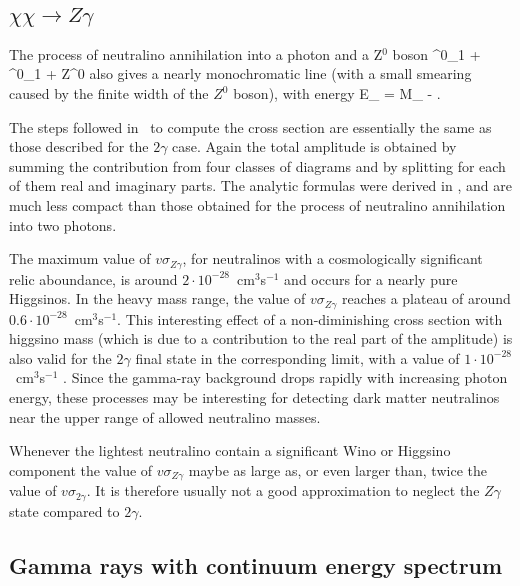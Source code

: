 \subsection{$\chi\chi\to Z\gamma$}

The process of neutralino annihilation into a photon and a Z$^0$ boson
\cite{ub}
\beq
\tilde{\chi}^{0}_{1} + \tilde{\chi}^{0}_{1} \rightarrow \gamma
+ Z^0
\eeq
also gives a nearly
monochromatic line (with a small smearing caused by the finite
  width of the $Z^0$ boson), with  energy
\beq
E_{\gamma} = M_{\chi} - .
\eeq

The steps followed in \ds\
to compute the cross section are essentially the same
as those described for the  $2\gamma$ case.
Again the total amplitude is obtained by summing the contribution
from four classes of diagrams and by splitting for each of them 
real and imaginary parts. The analytic formulas were derived in 
\cite{ub}, and are much less compact than those 
obtained for the process of neutralino annihilation into two photons.

The maximum value of $v\sigma_{Z\gamma}$, for neutralinos with a 
cosmologically significant relic aboundance, is around 
$2\cdot 10^{-28}$~cm$^3$s$^{-1}$ and occurs for a nearly
pure Higgsinos. In the heavy mass range, the value of $v\sigma_{Z\gamma}$
reaches a plateau of around $0.6 \cdot 10^{-28}$~cm$^3$s$^{-1}$. This
interesting effect of a non-diminishing cross section with higgsino mass
(which is due to a contribution to the real part of the amplitude)
is also valid for the $2\gamma$ final state in the corresponding limit, 
with a value of $1\cdot 10^{-28}$~cm$^3$s$^{-1}$ \cite{lp}.
Since the gamma-ray background drops rapidly with increasing photon
energy, these processes may be interesting for detecting dark
matter neutralinos near the upper range of allowed neutralino masses.

Whenever the lightest neutralino contain a significant Wino or Higgsino
component the value of $v\sigma_{Z\gamma}$ maybe as large as, or even larger 
than, twice the value of $v\sigma_{2\gamma}$. It is therefore usually
not a good approximation to neglect the $Z\gamma$ state compared to
$2\gamma$.


\subsection{Gamma rays with continuum energy spectrum}

